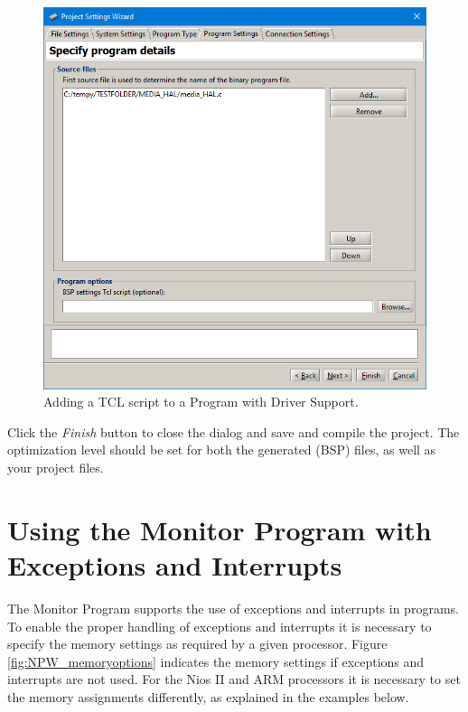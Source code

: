 \documentclass[11pt, twoside, pdftex]{article}
\begin{document}
\begin{figure}[H]
	\begin{center}
		\includegraphics[scale=0.6]{screenshots/tclScript.png}
	\end{center}
	\caption{Adding a TCL script to a Program with Driver Support.}
	\label{fig:NPW_tclScript}
\end{figure}

Click the {\it Finish} button to close the dialog and save and compile the project. The optimization level should be set for both the generated (BSP) files, as well as your project files.

\clearpage
\newpage
\section{Using the Monitor Program with Exceptions and Interrupts}

The Monitor Program supports the use of exceptions and interrupts
in programs. To enable the proper handling of exceptions and 
interrupts it is necessary to specify the memory settings as
required by a given processor. Figure \ref{fig:NPW_memoryoptions} indicates the memory 
settings if exceptions and interrupts are not used. For the 
Nios II and ARM processors it is necessary to set the memory
assignments differently, as explained in the examples below.
\end{document}

